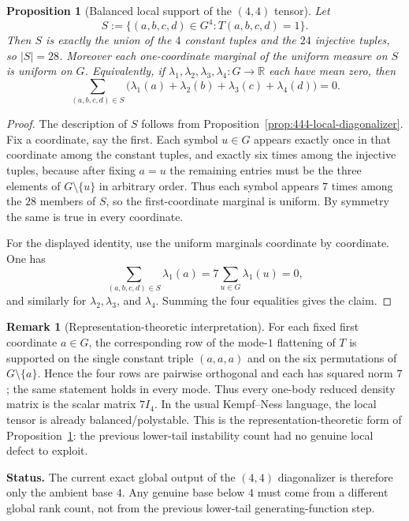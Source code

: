\documentclass[11pt]{article}
\newtheorem{proposition}[theorem]{Proposition}
\theoremstyle{definition}
\newtheorem{remark}[theorem]{Remark}
\newcommand{\R}{\mathbb{R}}
\newcommand{\1}{\mathbf{1}}
\newcommand{\status}[1]{\par\smallskip\noindent\textbf{Status.} #1\par\smallskip}
\begin{document}
\begin{proposition}[Balanced local support of the $(4,4)$ tensor]\label{prop:444-balanced}
Let
\[
S:=\{(a,b,c,d)\in G^4:T(a,b,c,d)=1\}.
\]
Then $S$ is exactly the union of the $4$ constant tuples and the $24$ injective tuples, so $|S|=28$. Moreover each one-coordinate marginal of the uniform measure on $S$ is uniform on $G$. Equivalently, if $\lambda_1,\lambda_2,\lambda_3,\lambda_4:G\to \R$ each have mean zero, then
\[
\sum_{(a,b,c,d)\in S}\bigl(\lambda_1(a)+\lambda_2(b)+\lambda_3(c)+\lambda_4(d)\bigr)=0.
\]
\end{proposition}

\begin{proof}
The description of $S$ follows from Proposition~\ref{prop:444-local-diagonalizer}. Fix a coordinate, say the first. Each symbol $u\in G$ appears exactly once in that coordinate among the constant tuples, and exactly six times among the injective tuples, because after fixing $a=u$ the remaining entries must be the three elements of $G\setminus\{u\}$ in arbitrary order. Thus each symbol appears $7$ times among the $28$ members of $S$, so the first-coordinate marginal is uniform. By symmetry the same is true in every coordinate.

For the displayed identity, use the uniform marginals coordinate by coordinate. One has
\[
\sum_{(a,b,c,d)\in S}\lambda_1(a)=7\sum_{u\in G}\lambda_1(u)=0,
\]
and similarly for $\lambda_2,\lambda_3$, and $\lambda_4$. Summing the four equalities gives the claim.
\end{proof}

\begin{remark}[Representation-theoretic interpretation]\label{rem:444-polystable}
For each fixed first coordinate $a\in G$, the corresponding row of the mode-$1$ flattening of $T$ is supported on the single constant triple $(a,a,a)$ and on the six permutations of $G\setminus\{a\}$. Hence the four rows are pairwise orthogonal and each has squared norm $7$; the same statement holds in every mode. Thus every one-body reduced density matrix is the scalar matrix $7I_4$. In the usual Kempf--Ness language, the local tensor is already balanced/polystable. This is the representation-theoretic form of Proposition~\ref{prop:444-balanced}: the previous lower-tail instability count had no genuine local defect to exploit.
\end{remark}

\status{The current exact global output of the $(4,4)$ diagonalizer is therefore only the ambient base $4$. Any genuine base below $4$ must come from a different global rank count, not from the previous lower-tail generating-function step.}
\end{document}
